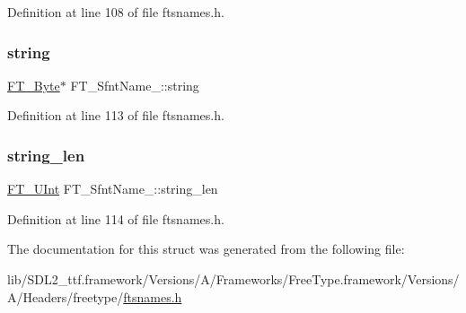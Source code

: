 Definition at line 108 of file ftsnames.\+h.

\mbox{\label{struct_f_t___sfnt_name___ab369e2c3d8dc9662f69c53e4d3158067}} 
\subsubsection{\texorpdfstring{string}{string}}
{\footnotesize\ttfamily \mbox{\hyperlink{fttypes_8h_a51f26183ca0c9f4af958939648caeccd}{F\+T\+\_\+\+Byte}}$\ast$ F\+T\+\_\+\+Sfnt\+Name\+\_\+\+::string}



Definition at line 113 of file ftsnames.\+h.

\mbox{\label{struct_f_t___sfnt_name___a4ebdb7207b5681d16f9cc17f432cb56f}} 
\subsubsection{\texorpdfstring{string\_len}{string\_len}}
{\footnotesize\ttfamily \mbox{\hyperlink{fttypes_8h_abcb8db4dbf35d2b55a9e8c7b0926dc52}{F\+T\+\_\+\+U\+Int}} F\+T\+\_\+\+Sfnt\+Name\+\_\+\+::string\+\_\+len}



Definition at line 114 of file ftsnames.\+h.



The documentation for this struct was generated from the following file\+:\begin{DoxyCompactItemize}
\item 
lib/\+S\+D\+L2\+\_\+ttf.\+framework/\+Versions/\+A/\+Frameworks/\+Free\+Type.\+framework/\+Versions/\+A/\+Headers/freetype/\mbox{\hyperlink{ftsnames_8h}{ftsnames.\+h}}\end{DoxyCompactItemize}
